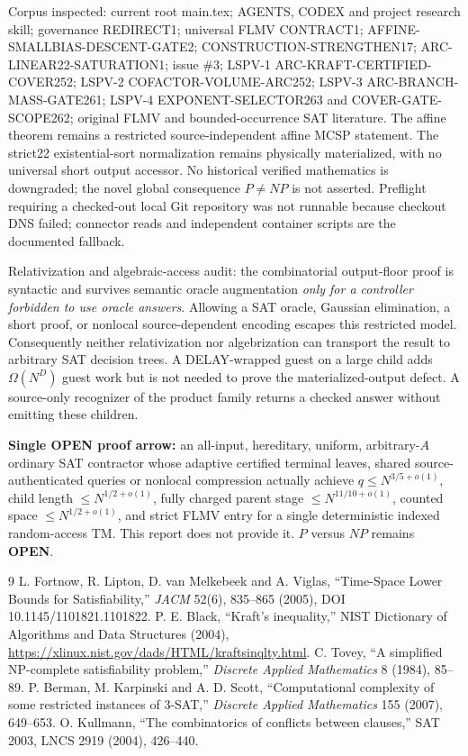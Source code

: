 \documentclass[11pt]{article}
\begin{document}
Corpus inspected: current root main.tex; AGENTS, CODEX and project research skill; governance REDIRECT1; universal FLMV CONTRACT1; AFFINE-SMALLBIAS-DESCENT-GATE2; CONSTRUCTION-STRENGTHEN17; ARC-LINEAR22-SATURATION1; issue \#3; LSPV-1 ARC-KRAFT-CERTIFIED-COVER252; LSPV-2 COFACTOR-VOLUME-ARC252; LSPV-3 ARC-BRANCH-MASS-GATE261; LSPV-4 EXPONENT-SELECTOR263 and COVER-GATE-SCOPE262; original FLMV and bounded-occurrence SAT literature. The affine theorem remains a restricted source-independent affine MCSP statement. The strict22 existential-sort normalization remains physically materialized, with no universal short output accessor. No historical verified mathematics is downgraded; the novel global consequence $P\ne NP$ is not asserted. Preflight requiring a checked-out local Git repository was not runnable because checkout DNS failed; connector reads and independent container scripts are the documented fallback.

Relativization and algebraic-access audit: the combinatorial output-floor proof is syntactic and survives semantic oracle augmentation \emph{only for a controller forbidden to use oracle answers}. Allowing a SAT oracle, Gaussian elimination, a short proof, or nonlocal source-dependent encoding escapes this restricted model. Consequently neither relativization nor algebrization can transport the result to arbitrary SAT decision trees. A DELAY-wrapped guest on a large child adds $\Omega(N^D)$ guest work but is not needed to prove the materialized-output defect. A source-only recognizer of the product family returns a checked answer without emitting these children.

\textbf{Single OPEN proof arrow:} an all-input, hereditary, uniform, arbitrary-$A$ ordinary SAT contractor whose adaptive certified terminal leaves, shared source-authenticated queries or nonlocal compression actually achieve $q\le N^{3/5+o(1)}$, child length $\le N^{1/2+o(1)}$, fully charged parent stage $\le N^{11/10+o(1)}$, counted space $\le N^{1/2+o(1)}$, and strict FLMV entry for a single deterministic indexed random-access TM. This report does not provide it. $P$ versus $NP$ remains \textbf{OPEN}.

\begin{thebibliography}{9}
 L. Fortnow, R. Lipton, D. van Melkebeek and A. Viglas, ``Time-Space Lower Bounds for Satisfiability,'' \emph{JACM} 52(6), 835--865 (2005), DOI 10.1145/1101821.1101822.
 P. E. Black, ``Kraft's inequality,'' NIST Dictionary of Algorithms and Data Structures (2004), \url{https://xlinux.nist.gov/dads/HTML/kraftsinqlty.html}.
 C. Tovey, ``A simplified NP-complete satisfiability problem,'' \emph{Discrete Applied Mathematics} 8 (1984), 85--89.
 P. Berman, M. Karpinski and A. D. Scott, ``Computational complexity of some restricted instances of 3-SAT,'' \emph{Discrete Applied Mathematics} 155 (2007), 649--653.
 O. Kullmann, ``The combinatorics of conflicts between clauses,'' SAT 2003, LNCS 2919 (2004), 426--440.
\end{thebibliography}
\end{document}
